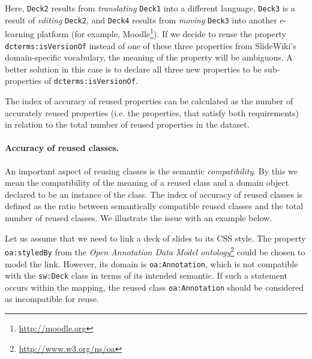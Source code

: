 Here, \texttt{Deck2} results from \emph{translating} \texttt{Deck1} into a different language, \texttt{Deck3} is a result of \emph{editing} \texttt{Deck2}, and \texttt{Deck4} results from \emph{moving} \texttt{Deck3} into another e-learning platform (for example, Moodle\footnote{\url{http://moodle.org}}).  
If we decide to reuse the property \texttt{dcterms:isVersionOf} instead of one of these three properties from SlideWiki's domain-specific vocabulary, the meaning of the property will be ambiguous. 
A better solution in this case is to declare all three new properties to be sub-properties of \texttt{dcterms:isVersionOf}.

The index of accuracy of reused properties can be calculated as the number of accurately reused properties (i.e. the properties, that satisfy both requirements) in relation to the total number of reused properties in the dataset.

\paragraph{Accuracy of reused classes.} 
An important aspect of reusing classes is the semantic \emph{compatibility}.
By this we mean the compatibility of the meaning of a reused class and a domain object declared to be an instance of the class.
The index of accuracy of reused classes is defined as the ratio between semantically compatible reused classes and the total number of reused classes.
We illustrate the issue with an example below.

Let us assume that we need to link a deck of slides to its CSS style.
The property \texttt{oa:styledBy} from the \emph{Open Annotation Data Model ontology}\footnote{\url{http://www.w3.org/ns/oa}} could be chosen to model the link.
However, its domain is \texttt{oa:Annotation}, which is not compatible with the \texttt{sw:Deck} class in terms of its intended semantic.
If such a statement occurs within the mapping, the reused class \texttt{oa:Annotation} should be considered as incompatible for reuse.

